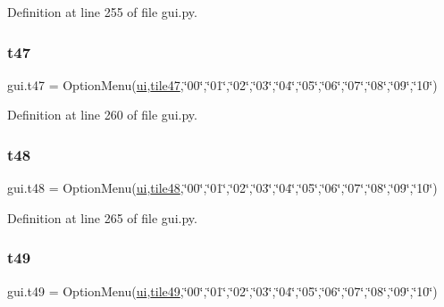 Definition at line 255 of file gui.\+py.

\mbox{\label{namespacegui_afecc97dbd52b5ac17c2bc1fb79c14b14}} 
\subsubsection{\texorpdfstring{t47}{t47}}
{\footnotesize\ttfamily gui.\+t47 = Option\+Menu(\mbox{\hyperlink{namespacegui_a40ab7281456eadbea2dc2038f5c24fa1}{ui}},\mbox{\hyperlink{namespacegui_a09c1aa53fc228e0b1f3645149832c496}{tile47}},\char`\"{}00\char`\"{},\char`\"{}01\char`\"{},\char`\"{}02\char`\"{},\char`\"{}03\char`\"{},\char`\"{}04\char`\"{},\char`\"{}05\char`\"{},\char`\"{}06\char`\"{},\char`\"{}07\char`\"{},\char`\"{}08\char`\"{},\char`\"{}09\char`\"{},\char`\"{}10\char`\"{})}



Definition at line 260 of file gui.\+py.

\mbox{\label{namespacegui_a393fdf7dceba469ee5cd447f5ec47689}} 
\subsubsection{\texorpdfstring{t48}{t48}}
{\footnotesize\ttfamily gui.\+t48 = Option\+Menu(\mbox{\hyperlink{namespacegui_a40ab7281456eadbea2dc2038f5c24fa1}{ui}},\mbox{\hyperlink{namespacegui_a174b37164c4494cb221388aa7ceb65bc}{tile48}},\char`\"{}00\char`\"{},\char`\"{}01\char`\"{},\char`\"{}02\char`\"{},\char`\"{}03\char`\"{},\char`\"{}04\char`\"{},\char`\"{}05\char`\"{},\char`\"{}06\char`\"{},\char`\"{}07\char`\"{},\char`\"{}08\char`\"{},\char`\"{}09\char`\"{},\char`\"{}10\char`\"{})}



Definition at line 265 of file gui.\+py.

\mbox{\label{namespacegui_a8662e7d514c7809efa91cc618502f069}} 
\subsubsection{\texorpdfstring{t49}{t49}}
{\footnotesize\ttfamily gui.\+t49 = Option\+Menu(\mbox{\hyperlink{namespacegui_a40ab7281456eadbea2dc2038f5c24fa1}{ui}},\mbox{\hyperlink{namespacegui_a59285f7ea83c2953e86335c182b23524}{tile49}},\char`\"{}00\char`\"{},\char`\"{}01\char`\"{},\char`\"{}02\char`\"{},\char`\"{}03\char`\"{},\char`\"{}04\char`\"{},\char`\"{}05\char`\"{},\char`\"{}06\char`\"{},\char`\"{}07\char`\"{},\char`\"{}08\char`\"{},\char`\"{}09\char`\"{},\char`\"{}10\char`\"{})}



